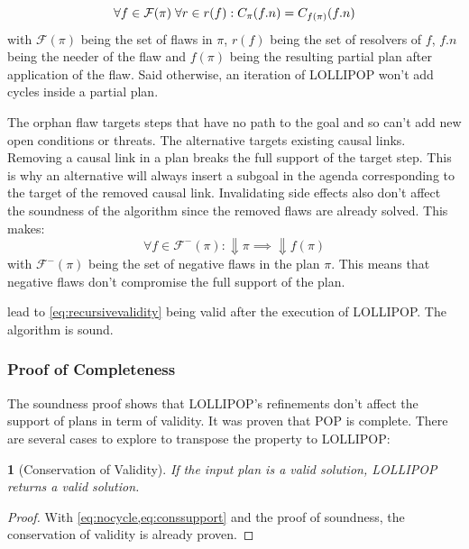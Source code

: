 \documentclass[11pt,a4paper,twoside,openright,titlepage,numbers=noenddot,headinclude,cleardoublepage=empty,openany]{scrreprt}
\theoremstyle{plain}
\newtheorem*{lemma}{\capitalisewords{lemma}}
\theoremstyle{definition}
\theoremstyle{remark}
\begin{document}
\begin{equation}\forall f \in \mathcal{F}(\pi) \thickspace \forall r \in r(f): C_\pi(f.n) = C_{f(\pi)}(f.n)\label{eq:nocycle}\end{equation}
with \(\mathcal{F}(\pi)\) being the set of flaws in \(\pi\), \(r(f)\)
being the set of resolvers of \(f\), \(f.n\) being the needer of the
flaw and \(f(\pi)\) being the resulting partial plan after application
of the flaw. Said otherwise, an iteration of LOLLIPOP won't add cycles
inside a partial plan.

The orphan flaw targets steps that have no path to the goal and so can't
add new open conditions or threats. The alternative targets existing
causal links. Removing a causal link in a plan breaks the full support
of the target step. This is why an alternative will always insert a
subgoal in the agenda corresponding to the target of the removed causal
link. Invalidating side effects also don't affect the soundness of the
algorithm since the removed flaws are already solved. This makes:
\begin{equation}
\forall f \in \mathcal{F}^-(\pi): \Downarrow \pi \implies \Downarrow f(\pi)
\label{eq:conssupport}\end{equation} with \(\mathcal{F}^-(\pi)\) being
the set of negative flaws in the plan \(\pi\). This means that negative
flaws don't compromise the full support of the plan.

 lead to \cref{eq:recursivevalidity}
being valid after the execution of LOLLIPOP. The algorithm is sound.

\hypertarget{proof-of-completeness}{%
\subsubsection{Proof of Completeness}\label{proof-of-completeness}}

The soundness proof shows that LOLLIPOP's refinements don't affect the
support of plans in term of validity. It was proven that POP is
complete. There are several cases to explore to transpose the property
to LOLLIPOP:

\begin{lemma}[Conservation of Validity]

If the input plan is a valid solution, LOLLIPOP returns a valid
solution.

\end{lemma}

\begin{proof}

With \cref{eq:nocycle,eq:conssupport} and the proof of soundness, the
conservation of validity is already proven. \qedhere

\end{proof}
\end{document}
